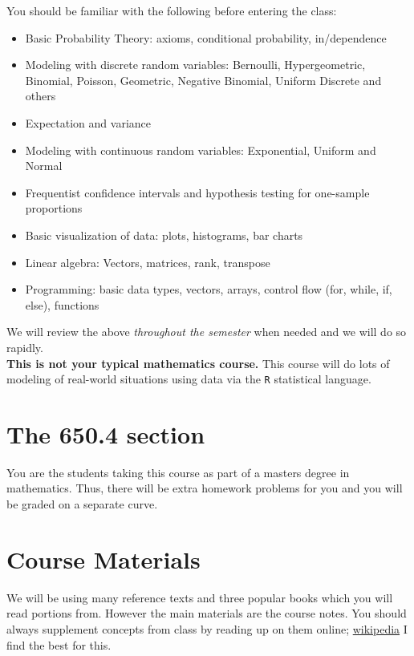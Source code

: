 \documentclass[12pt]{article}
\begin{document}
You should be familiar with the following before entering the class:

\begin{itemize}
\itemsep -0.0em 
\item Basic Probability Theory: axioms, conditional probability, in/dependence
\item Modeling with discrete random variables: Bernoulli, Hypergeometric, Binomial, Poisson, Geometric, Negative Binomial, Uniform Discrete and others
\item Expectation and variance
\item Modeling with continuous random variables: Exponential, Uniform and Normal
\item Frequentist confidence intervals and hypothesis testing for one-sample proportions
\item Basic visualization of data: plots, histograms, bar charts
\item Linear algebra: Vectors, matrices, rank, transpose
\item Programming: basic data types, vectors, arrays, control flow (for, while, if, else), functions
\end{itemize}

\noindent We will review the above \textit{throughout the semester} when needed and we will do so rapidly. \\

\textbf{This is not your typical mathematics course.} This course will do lots of modeling of real-world situations using data via the \texttt{R} statistical language.

\section*{The 650.4 section}

You are the students taking this course as part of a masters degree in mathematics. Thus, there will be extra homework problems for you and you will be graded on a separate curve.

\section*{Course Materials}

We will be using many reference texts and three popular books which you will read portions from. However the main materials are the course notes. You should always supplement concepts from class by reading up on them online; \href{https://en.wikipedia.org}{wikipedia} I find the best for this. 
\end{document}
